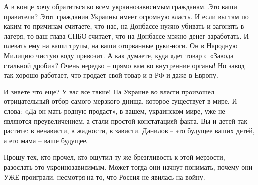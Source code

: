 А в конце хочу обратиться ко всем украинозависимым гражданам. Это ваши
правители? Этот гражданин Украины имеет огромную власть. И если вы там по
каким-то причинам считаете, что нас, на Донбассе нужно убивать и загонять в
лагеря, то ваш глава СНБО считает, что на Донбассе можно денег заработать. И
плевать ему на ваши трупы, на ваши оторванные руки-ноги. Он в Народную Милицию
чистую воду привозит. А как думаете, куда идет товар с «Завода стальной дроби»?
Очень нередко – прямо вам во внутренние органы! Но завод так хорошо работает,
что продает свой товар и в РФ и даже в Европу.

И знаете что еще? У вас все такие! На Украине во власти произошел отрицательный
отбор самого мерзкого днища, которое существует в мире. И слова: «Да он мать
родную продаст», в вашем, украинском мире, уже не являются преувеличением, а
стали простой констатацией факта. Вы и детей так растите: в ненависти, в
жадности, в зависти. Данилов – это будущее ваших детей, а его мама – ваше
будущее.

Прошу тех, кто прочел, кто ощутил ту же брезгливость к этой мерзости, разослать
это укроинозависимым. Может тогда они начнут понимать, почему они УЖЕ
проиграли, несмотря на то, что Россия не явилась на войну.  

